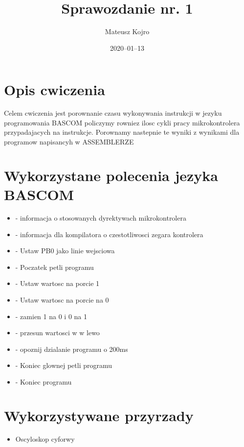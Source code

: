 \documentclass{article}
\title{Sprawozdanie nr. 1}
\author{Mateusz Kojro}
\date{2020–01–13}
\begin{document}
\maketitle

\section{Opis cwiczenia}
  Celem cwiczenia jest porownanie czasu wykonywania instrukcji w jezyku programowania BASCOM
  policzymy rowniez ilosc cykli pracy mikrokontrolera przypadajacych na instrukcje.
  Porownamy nastepnie te wyniki z wynikami dla programow napisancyh w ASSEMBLERZE 



\section{Wykorzystane polecenia jezyka BASCOM}

\begin{itemize}
\item {} - informacja o stosowanych dyrektywach mikrokontrolera
\item {} - informacja dla kompilatora o czestotliwosci zegara kontrolera 
\item {} - Ustaw PB0 jako linie wejsciowa
\item {} - Poczatek petli programu
\item {} - Ustaw wartosc na porcie 1
\item {} - Ustaw wartosc na porcie na 0
\item {} - zamien 1 na 0 i 0 na 1
\item {} - przesun wartosci w  w lewo
\item {} - opoznij dzialanie programu o 200ms
\item {} - Koniec glownej petli programu
\item {} - Koniec programu 
\end{itemize}

\section{Wykorzystywane przyrzady}
\begin{itemize}
  \item Oscyloskop cyforwy
\end{itemize}

\begin{lstlisting}[language=VBScript , caption=Kod programu generujacego sygnal PWM]

\end{lstlisting}
\end{document}
